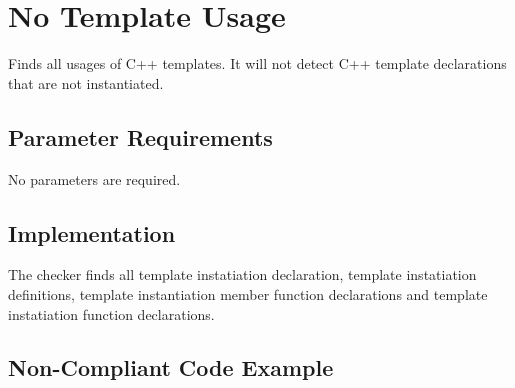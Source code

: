 %
%

\section{No Template Usage}
\label{NoTemplateUsage::overview}
Finds all usages of C++ templates. It will not detect
C++ template declarations that are not instantiated.


\subsection{Parameter Requirements}
No parameters are required.

\subsection{Implementation}
The checker finds all template instatiation declaration,
template instatiation definitions, template instantiation member
function declarations and template instatiation function declarations.
\subsection{Non-Compliant Code Example}


